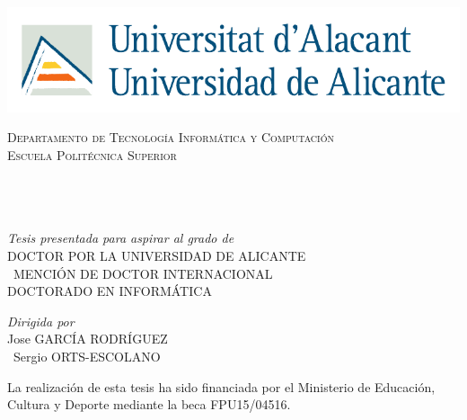 \begin{titlepage}
\begin{center}
	
\includegraphics[width=0.64\linewidth]{Figures/logoua}

\vfill

\textsc{\LARGE Departamento de Tecnología Informática y Computación}\\[1.5cm] %
\textsc{\Large Escuela Politécnica Superior}\\[0.5cm] %

{\huge \bfseries \ttitle}\\[0.4cm] %
 
\begin{center} \large
{\authorname} %
\\\ \\
\emph{Tesis presentada para aspirar al grado de} \\
{DOCTOR POR LA UNIVERSIDAD DE ALICANTE}\\\
{MENCIÓN DE DOCTOR INTERNACIONAL}\\
{DOCTORADO EN INFORMÁTICA}\\
\end{center}

\vfill
 
\large \textit{Dirigida por}\\[0.3cm] %
{Jose GARCÍA RODRÍGUEZ}\\\
{Sergio ORTS-ESCOLANO}\\
 
 \vfill
 
{\large La realización de esta tesis ha sido financiada por el Ministerio de Educación, Cultura y Deporte mediante la beca FPU15/04516.}\\[4cm] %
 
\end{center}
\end{titlepage}
